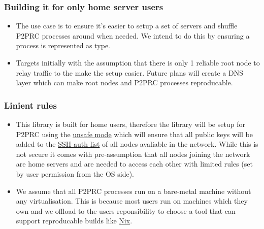 \documentclass[11pt]{article}
\begin{document}
\subsubsection{Building it for only home server users}
\label{sec:orge2d540d}
\begin{itemize}
\item The use case is to ensure it's easier to setup a set of servers and shuffle P2PRC processes around
when needed. We intend to do this by ensuring a process is represented as type.
\item Targets initially with the assumption that there is only 1 reliable root node to relay traffic to the make the setup
easier. Future plans will create a DNS layer which can make root nodes and P2PRC processes reproducable.
\end{itemize}

\subsubsection{Linient rules}
\label{sec:orge1dc5da}
\begin{itemize}
\item This library is built for home users, therefore the library will be setup for P2PRC using the \href{https://github.com/Akilan1999/p2p-rendering-computation/pull/115}{unsafe mode} which will ensure that all public
keys will be added to the \href{https://www.ssh.com/academy/ssh/authorized-keys-file\#:\~:text=The\%20authorized\_keys\%20file\%20in\%20SSH,keys\%20and\%20needs\%20proper\%20management}{SSH auth list} of all nodes avaliable in the network. While this is not secure it
comes with pre-assumption that all nodes joining the network are home servers and are needed to access each other
with limited rules (set by user permission from the OS side).
\item We assume that all P2PRC processes run on a bare-metal machine without any virtualisation.
This is because most users run on machines which they own and we offload to the users
reponsibility to choose a tool that can support reproducable builds like \href{https://nixos.org/}{Nix}.
\end{itemize}
\end{document}
